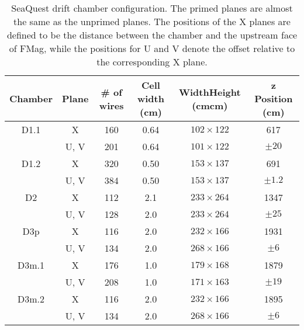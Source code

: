 \documentclass[../main.tex]{subfiles}
\begin{document}
\begin{table}[h!]
	\centering
	\caption{SeaQuest drift chamber configuration. The primed planes are almost the same as the unprimed
		planes. The positions of the X planes are defined to be the distance between the chamber and the
		upstream face of FMag, while the positions for U and V denote the offset relative to the corresponding
		X plane.}
	\label{table:chamber}
	\begin{tabular}{cccccc}
		\hline
		Chamber & Plane & \# of wires & Cell width (\unit{\cm}) & Width\texttimes Height (\unit{\cm}\texttimes\unit{\cm}) & z Position (\unit{cm}) \\ \hline
		D1.1    & X     & \num{160}   & \num{0.64}              & $102\times 122$                                         & \num{617}              \\
		        & U, V  & \num{201}   & \num{0.64}              & $101\times 122$                                         & $\pm20$                \\
		D1.2    & X     & \num{320}   & \num{0.50}              & $153\times 137$                                         & \num{691}              \\
		        & U, V  & \num{384}   & \num{0.50}              & $153\times 137$                                         & $\pm1.2$               \\
		D2      & X     & \num{112}   & \num{2.1}               & $233\times264$                                          & \num{1347}             \\
		        & U, V  & \num{128}   & \num{2.0}               & $233\times264$                                          & $\pm25$                \\
		D3p     & X     & \num{116}   & \num{2.0}               & $232\times166$                                          & \num{1931}             \\
		        & U, V  & \num{134}   & \num{2.0}               & $268\times166$                                          & $\pm6$                 \\
		D3m.1   & X     & \num{176}   & \num{1.0}               & $179\times168$                                          & \num{1879}             \\
		        & U, V  & \num{208}   & \num{1.0}               & $171\times163$                                          & $\pm19$                \\
		D3m.2   & X     & \num{116}   & \num{2.0}               & $232\times166$                                          & \num{1895}             \\
		        & U, V  & \num{134}   & \num{2.0}               & $268\times166$                                          & $\pm6$                 \\ \hline
	\end{tabular}
\end{table}
\end{document}

